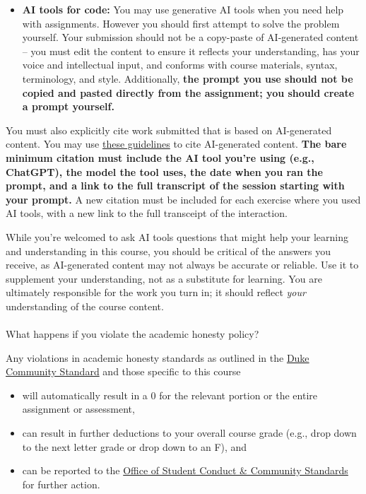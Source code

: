 \documentclass[
  letterpaper,
  DIV=11,
  numbers=noendperiod]{scrartcl}
\makeatletter
\let\oldparagraph\paragraph
\renewcommand{\paragraph}{
    \@ifstar
      \xxxParagraphStar
      \xxxParagraphNoStar
  }
\newcommand{\xxxParagraphStar}[1]{\oldparagraph*{#1}\mbox{}}
\newcommand{\xxxParagraphNoStar}[1]{\oldparagraph{#1}\mbox{}}
\providecommand{\tightlist}{%
  \setlength{\itemsep}{0pt}\setlength{\parskip}{0pt}}
\makeatother
\begin{document}
\begin{itemize}
  \begin{itemize}
  \tightlist
  \item
    {} \textbf{AI tools for code:} You may use generative
    AI tools when you need help with assignments. However you should
    first attempt to solve the problem yourself. Your submission should
    not be a copy-paste of AI-generated content -- you must edit the
    content to ensure it reflects your understanding, has your voice and
    intellectual input, and conforms with course materials, syntax,
    terminology, and style. Additionally, \textbf{the prompt you use
    should not be copied and pasted directly from the assignment; you
    should create a prompt yourself.}
  \end{itemize}

  You must also explicitly cite work submitted that is based on
  AI-generated content. You may use
  \href{https://guides.lib.monash.edu/c.php?g=219786&p=6972087}{these
  guidelines} to cite AI-generated content. \textbf{The bare minimum
  citation must include the AI tool you're using (e.g., ChatGPT), the
  model the tool uses, the date when you ran the prompt, and a link to
  the full transcript of the session starting with your prompt.} A new
  citation must be included for each exercise where you used AI tools,
  with a new link to the full transceipt of the interaction.
\end{itemize}

While you're welcomed to ask AI tools questions that might help your
learning and understanding in this course, you should be critical of the
answers you receive, as AI-generated content may not always be accurate
or reliable. Use it to supplement your understanding, not as a
substitute for learning. You are ultimately responsible for the work you
turn in; it should reflect \emph{your} understanding of the course
content.

\paragraph{What happens if you violate the academic honesty
policy?}\label{what-happens-if-you-violate-the-academic-honesty-policy}

Any violations in academic honesty standards as outlined in the
\href{https://trinity.duke.edu/undergraduate/academic-policies/community-standard-student-conduct}{Duke
Community Standard} and those specific to this course

\begin{itemize}
\item
  will automatically result in a 0 for the relevant portion or the
  entire assignment or assessment,
\item
  can result in further deductions to your overall course grade (e.g.,
  drop down to the next letter grade or drop down to an F), and
\item
  can be reported to the
  \href{https://students.duke.edu/get-assistance/community-standard/osccs/}{Office
  of Student Conduct \& Community Standards} for further action.
\end{itemize}
\end{document}
